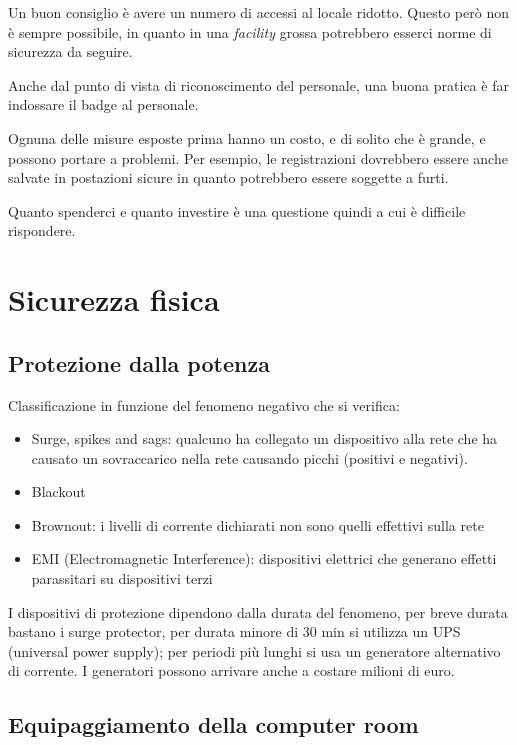 Un buon consiglio è avere un numero di accessi al locale ridotto. Questo però 
non è sempre possibile, in quanto in una \textit{facility} grossa potrebbero 
esserci norme di sicurezza da seguire.

Anche dal punto di vista di riconoscimento del personale, una buona pratica è 
far indossare il badge al personale.

Ognuna delle misure esposte prima hanno un costo, e di solito che è grande, e 
possono portare a problemi. Per esempio, le registrazioni dovrebbero essere 
anche salvate in postazioni sicure in quanto potrebbero essere soggette a furti.

Quanto spenderci e quanto investire è una questione quindi a cui è difficile 
rispondere.

\section{Sicurezza fisica}
\label{SFDP:fisica}
\subsection{Protezione dalla potenza}

Classificazione in funzione del fenomeno negativo che si verifica:
\begin{itemize}
\item Surge, spikes and sags: qualcuno ha collegato un dispositivo alla rete che 
ha causato un sovraccarico nella rete causando picchi (positivi e negativi).
\item Blackout
\item Brownout: i livelli di corrente dichiarati non sono quelli effettivi sulla 
rete
\item EMI (Electromagnetic Interference): dispositivi elettrici che generano 
effetti parassitari su dispositivi terzi
\end{itemize}

I dispositivi di protezione dipendono dalla durata del fenomeno, per breve 
durata bastano i surge protector, per durata minore di 30 min si utilizza un UPS 
(universal power supply); per periodi più lunghi si usa un generatore 
alternativo di corrente. I generatori possono arrivare anche a costare milioni 
di euro.

\subsection{Equipaggiamento della computer room}

